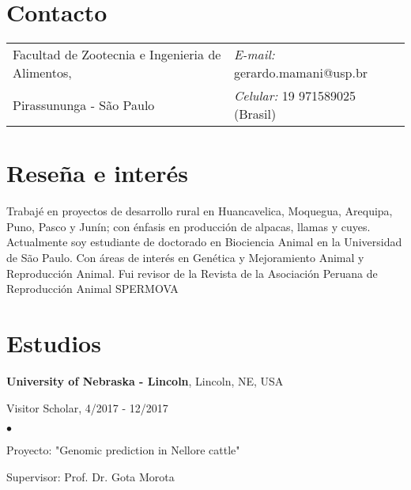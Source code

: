 \documentclass[margin,line,10pt]{res}
\newenvironment{list1}{
  \begin{list}{\ding{113}}{%
      \setlength{\itemsep}{0in}
      \setlength{\parsep}{0in} \setlength{\parskip}{0in}
      \setlength{\topsep}{0in} \setlength{\partopsep}{0in} 
      \setlength{\leftmargin}{0.17in}}}{\end{list}}
\newenvironment{list2}{
  \begin{list}{$\bullet$}{%
      \setlength{\itemsep}{0in}
      \setlength{\parsep}{0in} \setlength{\parskip}{0in}
      \setlength{\topsep}{0in} \setlength{\partopsep}{0in} 
      \setlength{\leftmargin}{0.2in}}}{\end{list}}
\begin{document}

\begin{resume}
\section{\sc Contacto}
\vspace{.05in}
\begin{tabular}{@{}p{3in}p{4in}}
Facultad de Zootecnia e Ingenieria de Alimentos,    & \hspace{2.5cm} {\it E-mail:}  gerardo.mamani@usp.br\\       
Pirassununga - São Paulo  & \hspace{2.5cm} {\it Celular:} 19 971589025 (Brasil)\\     

\end{tabular}

\vspace{0.3cm}
\section{\sc Reseña e interés}
Trabajé en proyectos de desarrollo rural en Huancavelica, Moquegua, Arequipa, Puno, Pasco y Junín; con énfasis en producción de alpacas, llamas y cuyes. Actualmente soy estudiante de doctorado en Biociencia Animal en la Universidad de São Paulo. Con áreas de interés en Genética y Mejoramiento Animal y Reproducción Animal. Fui revisor de la Revista de la Asociación Peruana de Reproducción Animal SPERMOVA
 
\section{\sc Estudios}

{\bf University of Nebraska - Lincoln}, Lincoln, NE, USA\\
\vspace*{-.1in}
\begin{list1}
\item[] Visitor Scholar, 4/2017 - 12/2017
\begin{list2}
\vspace*{.05in}
\item Proyecto: "Genomic prediction in Nellore cattle" 
\item Supervisor: Prof. Dr. Gota Morota
\end{list2}
\vspace*{.05in}
\end{list1}


\end{resume}
\end{document}
